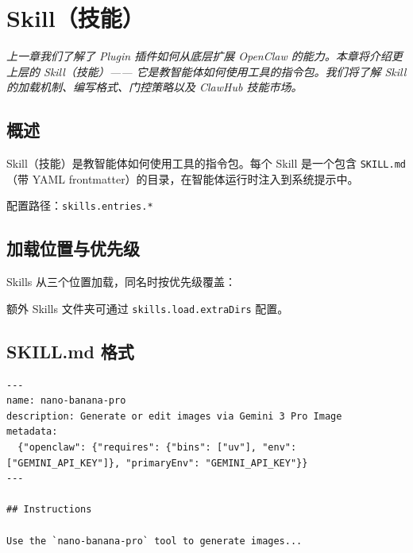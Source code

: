 \chapter{Skill（技能）}

\vspace{0.5em}
\noindent\textit{上一章我们了解了 Plugin 插件如何从底层扩展 OpenClaw 的能力。本章将介绍更上层的 Skill（技能）——
它是教智能体如何使用工具的指令包。我们将了解 Skill 的加载机制、编写格式、门控策略以及 ClawHub 技能市场。}
\vspace{0.5em}

\section{概述}

Skill（技能）是教智能体如何使用工具的指令包。每个 Skill 是一个包含 \texttt{SKILL.md}（带 YAML frontmatter）的目录，在智能体运行时注入到系统提示中。

配置路径：\texttt{skills.entries.*}

\section{加载位置与优先级}

Skills 从三个位置加载，同名时按优先级覆盖：

\begin{center}
\end{center}

额外 Skills 文件夹可通过 \texttt{skills.load.extraDirs} 配置。

\section{SKILL.md 格式}

\begin{lstlisting}
---
name: nano-banana-pro
description: Generate or edit images via Gemini 3 Pro Image
metadata:
  {"openclaw": {"requires": {"bins": ["uv"], "env": ["GEMINI_API_KEY"]}, "primaryEnv": "GEMINI_API_KEY"}}
---

## Instructions

Use the `nano-banana-pro` tool to generate images...
\end{lstlisting}

